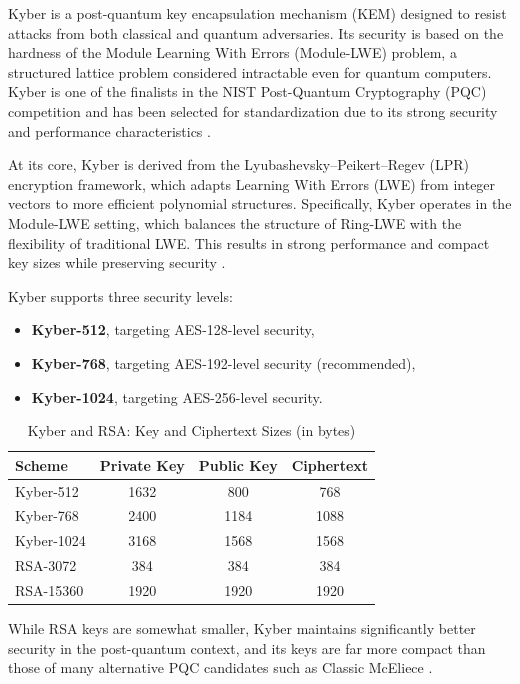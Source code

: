 Kyber is a post-quantum key encapsulation mechanism (KEM) designed to resist attacks from both classical and quantum adversaries. Its security is based on the hardness of the Module Learning With Errors (Module-LWE) problem, a structured lattice problem considered intractable even for quantum computers. Kyber is one of the finalists in the NIST Post-Quantum Cryptography (PQC) competition and has been selected for standardization due to its strong security and performance characteristics \cite{kyber2024}.  %

At its core, Kyber is derived from the Lyubashevsky–Peikert–Regev (LPR) encryption framework, which adapts Learning With Errors (LWE) from integer vectors to more efficient polynomial structures. Specifically, Kyber operates in the Module-LWE setting, which balances the structure of Ring-LWE with the flexibility of traditional LWE. This results in strong performance and compact key sizes while preserving security \cite{kyber2024,kyber2021}. %

Kyber supports three security levels:
\begin{itemize}
    \item \textbf{Kyber-512}, targeting AES-128-level security,
    \item \textbf{Kyber-768}, targeting AES-192-level security (recommended),
    \item \textbf{Kyber-1024}, targeting AES-256-level security.
\end{itemize}

\begin{table}[h]
\centering
\caption{Kyber and RSA: Key and Ciphertext Sizes (in bytes)}
\label{tab:kyber_sizes}
\begin{tabular}{|l|c|c|c|}
\hline
\textbf{Scheme} & \textbf{Private Key} & \textbf{Public Key} & \textbf{Ciphertext} \\
\hline
Kyber-512 & 1632 & 800 & 768 \\
Kyber-768 & 2400 & 1184 & 1088 \\
Kyber-1024 & 3168 & 1568 & 1568 \\
RSA-3072 & 384 & 384 & 384 \\
RSA-15360 & 1920 & 1920 & 1920 \\
\hline
\end{tabular}
\end{table}

While RSA keys are somewhat smaller, Kyber maintains significantly better security in the post-quantum context, and its keys are far more compact than those of many alternative PQC candidates such as Classic McEliece \cite{kyber2021}. %

